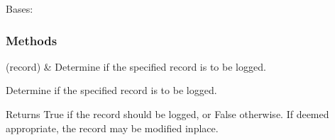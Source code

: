 \documentclass[letterpaper,10pt,english]{sphinxmanual}
\begin{document}
\begin{fulllineitems}
\label{\detokenize{CoolDwarf.utils.misc:CoolDwarf.utils.misc.logging.ExcludeCustomFilter}}
\pysigstartsignatures
{}
\pysigstopsignatures
\sphinxAtStartPar
Bases: 
\subsubsection*{Methods}


\begin{savenotes}\sphinxattablestart
\sphinxthistablewithglobalstyle
\sphinxthistablewithnovlinesstyle
\centering
\begin{tabulary}{\linewidth}[t]{}
\sphinxtoprule
\sphinxtableatstartofbodyhook
\sphinxAtStartPar
{\hyperref[\detokenize{CoolDwarf.utils.misc:CoolDwarf.utils.misc.logging.ExcludeCustomFilter.filter}]{}}(record)
&
\sphinxAtStartPar
Determine if the specified record is to be logged.
\\
\sphinxbottomrule
\end{tabulary}
\sphinxtableafterendhook\par
\sphinxattableend\end{savenotes}

\begin{fulllineitems}
\label{\detokenize{CoolDwarf.utils.misc:CoolDwarf.utils.misc.logging.ExcludeCustomFilter.filter}}
\pysigstartsignatures
{}
\pysigstopsignatures
\sphinxAtStartPar
Determine if the specified record is to be logged.

\sphinxAtStartPar
Returns True if the record should be logged, or False otherwise.
If deemed appropriate, the record may be modified in\sphinxhyphen{}place.

\end{fulllineitems}


\end{fulllineitems}
\end{document}
